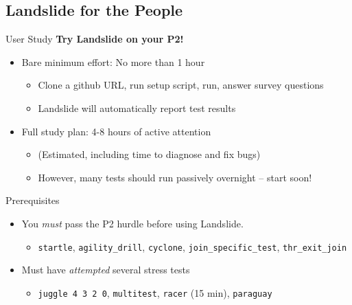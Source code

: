 \documentclass[xcolor=dvipsnames]{beamer}
\begin{document}

\subsection{Landslide for the People}

\begin{frame}{User Study}
	\textbf{Try Landslide on your P2!}
	\begin{itemize}
		\item Bare minimum effort: No more than 1 hour
		\begin{itemize}
			\item Clone a github URL, run setup script, run, answer survey questions
			\item Landslide will automatically report test results
		\end{itemize}
		\item Full study plan: 4-8 hours of active attention
		\begin{itemize}
			\item (Estimated, including time to diagnose and fix bugs)
			\item However, many tests should run passively overnight -- start soon!
		\end{itemize}
	\end{itemize}
	\pause
	\linegap

	Prerequisites
	\begin{itemize}
		\item You {\em must} pass the P2 hurdle before using Landslide.
		\begin{itemize}
			\item {\tt startle}, {\tt agility\_drill}, {\tt cyclone}, {\tt join\_specific\_test}, {\tt thr\_exit\_join}
		\end{itemize}
		\item Must have {\em attempted} several stress tests
		\begin{itemize}
			\item {\tt juggle 4 3 2 0}, {\tt multitest}, {\tt racer} (15 min), {\tt paraguay}
		\end{itemize}

	\end{itemize}
\end{frame}
\end{document}
